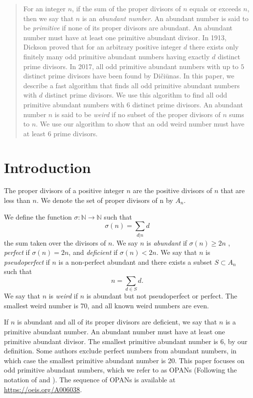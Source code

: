 \documentclass[../paper.tex]{article}
\begin{document}
\begin{abstract}
For an integer $n$, if the sum of the proper divisors of 
$n$ equals or exceeds $n$, then we say that $n$ is an 
\textit{abundant number}.  An abundant number is said to be 
\textit{primitive} if none of its proper divisors are abundant. 
An abundant number must have at least one primitive abundant 
divisor. In 1913, Dickson proved that for an arbitrary positive
integer $d$ there exists only finitely many odd primitive abundant
numbers having exactly $d$ distinct prime divisors. In 2017, all 
odd primitive abundant numbers with up to $5$ distinct prime 
divisors have been found by Di\v{c}i\={u}nas. In this paper, we 
describe a fast algorithm that finds all odd primitive abundant 
numbers with $d$ distinct prime divisors. We use this algorithm 
to find all odd primitive abundant numbers with $6$ distinct prime
divisors. An abundant number $n$ is said to be \textit{weird} if 
no subset of the proper divisors of $n$ sums to $n$. We use our 
algorithm to show that an odd weird number must have at least $6$
prime divisors.
\end{abstract}

\section{Introduction}
The proper divisors of a positive integer $n$ are the positive
divisors of $n$ that are less than $n$. We denote the set of 
proper divisors of n by $\textit{A}_{n}$.

We define the function 
%
$\sigma: \mathbb{N} \rightarrow \mathbb{N}$
%
such that
%
$$\sigma(n) = \sum_{d|n}d$$
%
the sum taken over the divisors of $n$. We say $n$ is 
\textit{abundant} if $\sigma(n) \geq 2n$ \footnotemark
, \textit{perfect} if $\sigma(n) = 2n$, and \textit{deficient} if 
$\sigma(n) < 2n$. We say that $n$ is \textit{pseudoperfect} if 
$n$ is a non-perfect abundant and there exists a subset $ S 
\subset \textit{A}_{n}$ such that
%
%
%
$$ n = \sum_{d \in S} d .$$
%
We say that $n$ is \textit{weird} if $n$ is abundant but not 
pseudoperfect or perfect. The smallest weird number is 70, and 
all known weird numbers are even.

If $n$ is abundant and all of its proper divisors are deficient,
we say that $n$ is a primitive abundant number. An abundant number must 
have at least one primitive abundant divisor. The smallest primitive abundant 
number is 6, by our definition. Some authors exclude perfect
numbers from abundant numbers, in which case the smallest primitive abundant
number is 20. This paper focuses
on odd primitive abundant numbers, which we refer to as OPANs
(Following the notation of \cite{valdas} and \cite{amato}). The sequence 
of OPANs is available at \url{https://oeis.org/A006038}.\cite{oeis}
\end{document}
